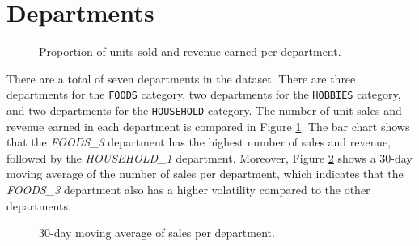 \section{Departments}
\begin{figure}
    \vspace{-10pt}
    \centering
    \captionsetup{width=0.52\textwidth}
    \caption{Proportion of units sold and revenue earned per department.}
    \label{fig:sales_rev_depts}
    \vspace{-10pt}
\end{figure}
There are a total of seven departments in the dataset. 
There are three departments for the \texttt{FOODS} category, two departments for the \texttt{HOBBIES} category, and two departments for the \texttt{HOUSEHOLD} category.
The number of unit sales and revenue earned in each department is compared in Figure \ref{fig:sales_rev_depts}.
The bar chart shows that the \textit{FOODS\_3} department has the highest number of sales and revenue, followed by the \textit{HOUSEHOLD\_1} department.
Moreover, Figure \ref{fig:dept_sales} shows a 30-day moving average of the number of sales per department, which indicates that the \textit{FOODS\_3} department also has a higher volatility compared to the other departments.
\begin{figure}[H]
    \centering
    \caption{30-day moving average of sales per department.}
    \label{fig:dept_sales}
\end{figure}
